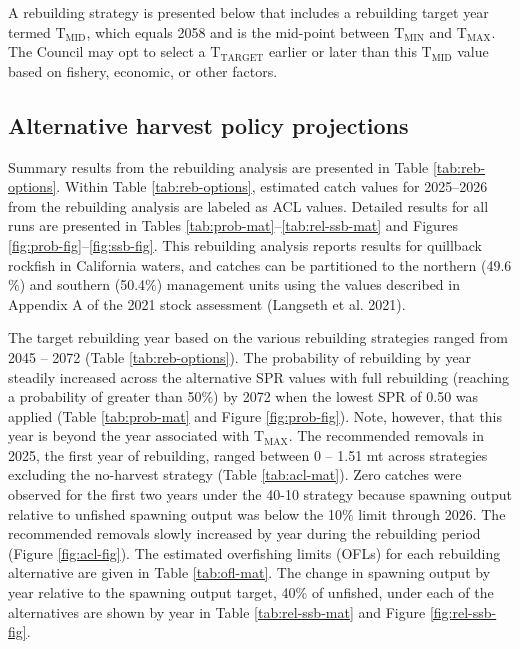 \documentclass[11pt,
  letterpaper,
]{article}
\begin{document}
A rebuilding strategy is presented below that includes a rebuilding target year termed \(\text{T}_\text{MID}\), which equals 2058 and is the mid-point between \(\text{T}_\text{MIN}\) and \(\text{T}_\text{MAX}\). The Council may opt to select a \(\text{T}_\text{TARGET}\) earlier or later than this \(\text{T}_\text{MID}\) value based on fishery, economic, or other factors.

\hypertarget{alternative-harvest-policy-projections}{%
\subsection{Alternative harvest policy projections}\label{alternative-harvest-policy-projections}}

Summary results from the rebuilding analysis are presented in Table \ref{tab:reb-options}. Within Table \ref{tab:reb-options}, estimated catch values for 2025--2026 from the rebuilding analysis are labeled as ACL values. Detailed results for all runs are presented in Tables \ref{tab:prob-mat}--\ref{tab:rel-ssb-mat} and Figures \ref{fig:prob-fig}--\ref{fig:ssb-fig}. This rebuilding analysis reports results for quillback rockfish in California waters, and catches can be partitioned to the northern (49.6\(\%\)) and southern (50.4\(\%\)) management units using the values described in Appendix A of the 2021 stock assessment (Langseth et al. 2021).

The target rebuilding year based on the various rebuilding strategies ranged from 2045 -- 2072 (Table \ref{tab:reb-options}). The probability of rebuilding by year steadily increased across the alternative SPR values with full rebuilding (reaching a probability of greater than 50\(\%\)) by 2072 when the lowest SPR of 0.50 was applied (Table \ref{tab:prob-mat} and Figure \ref{fig:prob-fig}). Note, however, that this year is beyond the year associated with \(\text{T}_\text{MAX}\). The recommended removals in 2025, the first year of rebuilding, ranged between 0 -- 1.51 mt across strategies excluding the no-harvest strategy (Table \ref{tab:acl-mat}). Zero catches were observed for the first two years under the 40-10 strategy because spawning output relative to unfished spawning output was below the 10\(\%\) limit through 2026. The recommended removals slowly increased by year during the rebuilding period (Figure \ref{fig:acl-fig}). The estimated overfishing limits (OFLs) for each rebuilding alternative are given in Table \ref{tab:ofl-mat}. The change in spawning output by year relative to the spawning output target, 40\(\%\) of unfished, under each of the alternatives are shown by year in Table \ref{tab:rel-ssb-mat} and Figure \ref{fig:rel-ssb-fig}.
\end{document}
